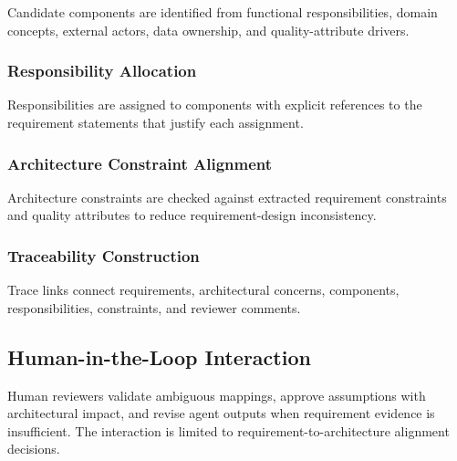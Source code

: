 Candidate components are identified from functional responsibilities, domain concepts, external actors, data ownership, and quality-attribute drivers.

\subsubsection{Responsibility Allocation}
\label{sec:method-responsibility-allocation}

Responsibilities are assigned to components with explicit references to the requirement statements that justify each assignment.

\subsubsection{Architecture Constraint Alignment}
\label{sec:method-constraint-alignment}

Architecture constraints are checked against extracted requirement constraints and quality attributes to reduce requirement-design inconsistency.

\subsubsection{Traceability Construction}
\label{sec:method-traceability}

Trace links connect requirements, architectural concerns, components, responsibilities, constraints, and reviewer comments.

\subsection{Human-in-the-Loop Interaction}
\label{sec:method-hitl}

Human reviewers validate ambiguous mappings, approve assumptions with architectural impact, and revise agent outputs when requirement evidence is insufficient.
The interaction is limited to requirement-to-architecture alignment decisions.
